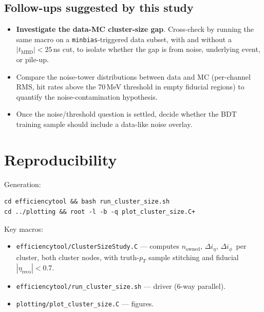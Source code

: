 \documentclass[11pt,a4paper]{article}
\newcommand{\nown}{$n_{\mathrm{owned}}$}
\newcommand{\dietag}{$\Delta i_\eta$}
\newcommand{\diphig}{$\Delta i_\phi$}
\begin{document}
\subsection*{Follow-ups suggested by this study}

\begin{itemize}
\item \textbf{Investigate the data-MC cluster-size gap}.  Cross-check
  by running the same macro on a \texttt{minbias}-triggered data
  subset, with and without a $|t_{\mathrm{MBD}}| < 25$\,ns cut, to
  isolate whether the gap is from noise, underlying event, or
  pile-up.
\item Compare the noise-tower distributions between data and MC
  (per-channel RMS, hit rates above the 70\,MeV threshold in empty
  fiducial regions) to quantify the noise-contamination hypothesis.
\item Once the noise/threshold question is settled, decide whether
  the BDT training sample should include a data-like noise overlay.
\end{itemize}

\section*{Reproducibility}

Generation:
\begin{verbatim}
cd efficiencytool && bash run_cluster_size.sh
cd ../plotting && root -l -b -q plot_cluster_size.C+
\end{verbatim}

Key macros:
\begin{itemize}
\item \texttt{efficiencytool/ClusterSizeStudy.C} --- computes \nown,
  \dietag, \diphig\ per cluster, both cluster nodes, with truth-$p_T$
  sample stitching and fiducial $|\eta_{\mathrm{reco}}|<0.7$.
\item \texttt{efficiencytool/run\_cluster\_size.sh} --- driver (6-way parallel).
\item \texttt{plotting/plot\_cluster\_size.C} --- figures.
\end{itemize}
\end{document}
